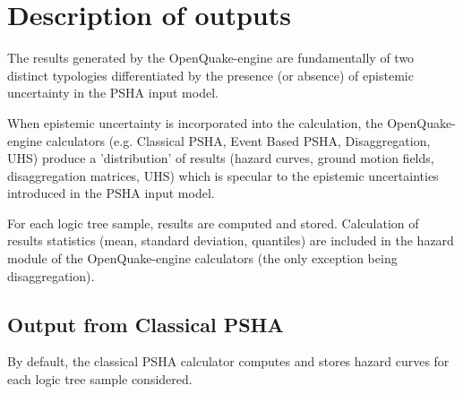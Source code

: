 \section{Description of outputs}
The results generated by the OpenQuake-engine are fundamentally 
of two distinct typologies differentiated by the presence (or 
absence) of epistemic uncertainty in the PSHA input model.

When epistemic uncertainty is incorporated into the 
calculation, the Open\-Quake\--engine calculators (e.g. Classical 
PSHA, Event Based PSHA, Disaggregation, UHS) produce a 
'distribution' of results (hazard curves, ground motion fields, 
disaggregation matrices, UHS) which is specular to the epistemic 
uncertainties introduced in the PSHA input model.

For each logic tree sample, results are computed and stored. 
Calculation of results statistics (mean, standard deviation, 
quantiles) are included in the hazard module of the 
OpenQuake-engine calculators (the only exception being 
disaggregation).
\subsection{Output from Classical PSHA}
By default, the classical PSHA calculator computes and stores 
hazard curves for each logic tree sample considered.

